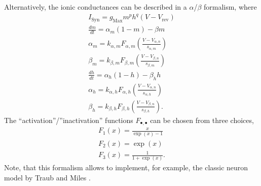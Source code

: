 \documentclass{article}
\begin{document}
\noindent
Alternatively, the ionic conductances can be described in a
$\alpha$/$\beta$ formalism, where
\begin{align}
I_{\text{Syn}}= g_{\text{Max}} m^p h^q (V-V_{\text{rev}}) \\
\frac{dm}{dt}= \alpha_m (1-m) - \beta m \\
\alpha_m= k_{\alpha,m} F_{\alpha,m}\left(\frac{V-V_{\alpha,n}}{s_{\alpha,m}}
\right) \\
\beta_m= k_{\beta,m} F_{\beta,m}\left(\frac{V-V_{\beta,n}}{s_{\beta,m}}
\right) \\
\frac{dh}{dt}= \alpha_h (1 - h) - \beta_h h \\
\alpha_h= k_{\alpha,h} F_{\alpha,h}\left(\frac{V-V_{\alpha,n}}{s_{\alpha,h}}
\right) \\
\beta_h= k_{\beta,h} F_{\beta,h}\left(\frac{V-V_{\beta,n}}{s_{\beta,h}}
\right).
\end{align}
The ``activation''/''inactivation'' functions $F_{\bullet , \bullet}$ can
be chosen from three choices,
\begin{align}
F_1(x)= \frac{x}{\exp(x)-1} \\
F_2(x)= \exp(x) \\
F_3(x)= \frac{1}{1+\exp(x)}.
\end{align}
Note, that this formalism allows to implement, for example, the classic
neuron model by Traub and Miles \cite{Traub1991}. \\
\end{document}
